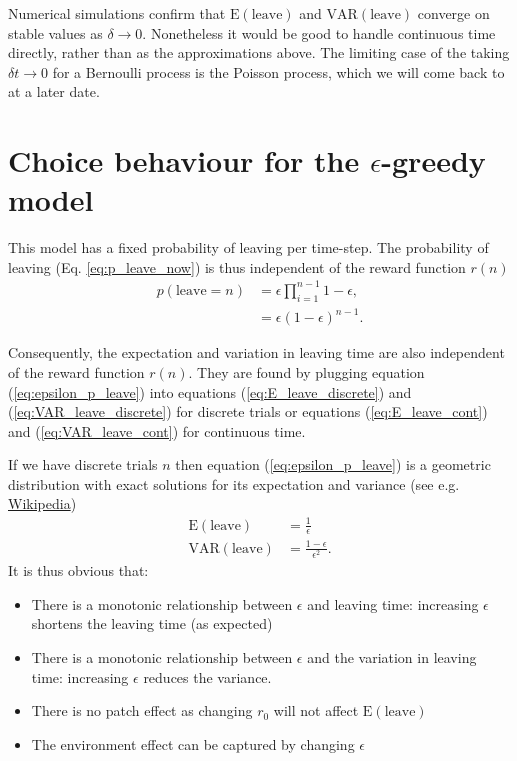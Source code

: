 \documentclass[11pt,a4paper]{article}
\begin{document}
Numerical simulations confirm that $\mathrm{E(leave)}$ and $\mathrm{VAR(leave)}$ converge on stable values as $\delta \rightarrow 0$. Nonetheless it would be good to handle continuous time directly, rather than as the approximations above. The limiting case of the taking $\delta t \rightarrow 0$ for a Bernoulli process is the Poisson process, which we will come back to at a later date. 

\section{Choice behaviour for the $\epsilon$-greedy model}
This model has a fixed probability of leaving per time-step. The probability of leaving (Eq. \ref{eq:p_leave_now}) is thus independent of the reward function $r(n)$  
\begin{align}
p(\mathrm{leave} = n) & = \epsilon \prod_{i=1}^{n-1} 1-\epsilon, \nonumber \\
& = \epsilon(1-\epsilon)^{n-1}. \label{eq:epsilon_p_leave}
\end{align}  

Consequently, the expectation and variation in leaving time are also independent of the reward function $r(n)$. They are found by plugging equation (\ref{eq:epsilon_p_leave}) into equations (\ref{eq:E_leave_discrete}) and (\ref{eq:VAR_leave_discrete}) for discrete trials or equations (\ref{eq:E_leave_cont}) and (\ref{eq:VAR_leave_cont}) for continuous time.

If we have discrete trials $n$ then equation (\ref{eq:epsilon_p_leave}) is a geometric distribution with exact solutions for its expectation and variance (see e.g. \href{https://en.wikipedia.org/wiki/Geometric\_distribution}{Wikipedia})
\begin{align*}\label{eq:geometric_distribution}
\mathrm{E(leave)} & = \frac{1}{\epsilon} \\
\mathrm{VAR(leave)} & = \frac{1-\epsilon}{\epsilon^2}.
\end{align*}
It is thus obvious that:
\begin{itemize}
	\item There is a monotonic relationship between $\epsilon$ and leaving time: increasing $\epsilon$ shortens the leaving time (as expected)
	\item There is a monotonic relationship between $\epsilon$ and the variation in leaving time: increasing $\epsilon$ reduces the variance. 
	\item There is no patch effect as changing $r_0$ will not affect $\mathrm{E(leave)}$
	\item The environment effect can be captured by changing $\epsilon$ 
\end{itemize}
\end{document}
